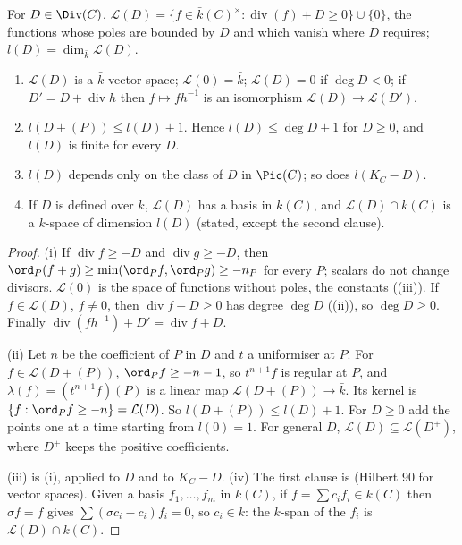 \begin{definition}\label{def:curves:riemann-roch-space}
For $D\in\Div(C)$, $\mathcal L(D)=\{f\in\bar k(C)^\times:\operatorname{div}(f)+D\ge0\}\cup\{0\}$, the functions whose poles are bounded by $D$ and which vanish where $D$
requires; $l(D)=\dim_{\bar k}\mathcal L(D)$.
\end{definition}

\begin{proposition}\label{prop:curves:riemann-roch-space}
\leavevmode
\begin{enumerate}[label=(\roman*)]
\item $\mathcal L(D)$ is a $\bar k$-vector space; $\mathcal L(0)=\bar k$; $\mathcal L(D)=0$ if $\deg D<0$; if $D'=D+\operatorname{div}h$ then $f\mapsto fh^{-1}$ is an isomorphism
$\mathcal L(D)\to\mathcal L(D')$.
\item $l(D+(P))\le l(D)+1$. Hence $l(D)\le\deg D+1$ for $D\ge0$, and $l(D)$ is finite for every $D$.
\item $l(D)$ depends only on the class of $D$ in $\Pic(C)$; so does $l(K_C-D)$.
\item If $D$ is defined over $k$, $\mathcal L(D)$ has a basis in $k(C)$, and $\mathcal L(D)\cap k(C)$ is a $k$-space of dimension $l(D)$ (stated, except the
second clause).
\end{enumerate}
\end{proposition}

\begin{proof}
(i) If $\operatorname{div}f\ge-D$ and $\operatorname{div}g\ge-D$, then $\ord_P(f+g)\ge\min(\ord_Pf,\ord_Pg)\ge-n_P$ for every $P$; scalars do not change divisors.
$\mathcal L(0)$ is the space of functions without poles, the constants ((iii)). If $f\in\mathcal L(D)$, $f\ne0$, then
$\operatorname{div}f+D\ge0$ has degree $\deg D$ ((ii)), so $\deg D\ge0$. Finally $\operatorname{div}(fh^{-1})+D'=\operatorname{div}f+D$.

(ii) Let $n$ be the coefficient of $P$ in $D$ and $t$ a uniformiser at $P$. For $f\in\mathcal L(D+(P))$, $\ord_Pf\ge-n-1$, so $t^{n+1}f$ is regular at $P$, and
$\lambda(f)=(t^{n+1}f)(P)$ is a linear map $\mathcal L(D+(P))\to\bar k$. Its kernel is $\{f:\ord_Pf\ge-n\}=\mathcal L(D)$. So $l(D+(P))\le l(D)+1$. For $D\ge0$ add the
points one at a time starting from $l(0)=1$. For general $D$, $\mathcal L(D)\subseteq\mathcal L(D^+)$, where $D^+$ keeps the positive coefficients.

(iii) is (i), applied to $D$ and to $K_C-D$. (iv) The first clause is \cite[Chapter II, Proposition 5.8]{SilvermanAEC} (Hilbert 90 for vector spaces).
Given a basis $f_1,\dots,f_m$ in $k(C)$, if $f=\sum c_if_i\in k(C)$ then $\sigma f=f$ gives $\sum(\sigma c_i-c_i)f_i=0$, so $c_i\in k$: the $k$-span of the $f_i$ is
$\mathcal L(D)\cap k(C)$.
\end{proof}

